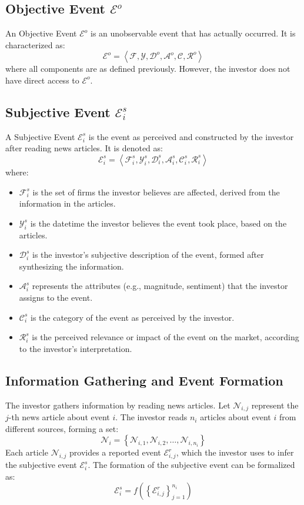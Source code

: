 \documentclass[12pt,article]{memoir}
\begin{document}
\subsection{Objective Event $\mathcal{E}^o$}
An Objective Event $\mathcal{E}^o$ is an unobservable event that has actually occurred. It is characterized as:
$$
\mathcal{E}^o=\left\langle\mathcal{F}, \mathcal{Y}, \mathcal{D}^o, \mathcal{A}^o, \mathcal{C}, \mathcal{R}^o\right\rangle
$$
where all components are as defined previously. However, the investor does not have direct access to $\mathcal{E}^o$.

\subsection{Subjective Event $\mathcal{E}_i^s$}
A Subjective Event $\mathcal{E}_i^s$ is the event as perceived and constructed by the investor after reading news articles. It is denoted as:
$$
\mathcal{E}_i^s=\left\langle\mathcal{F}_i^s, \mathcal{Y}_i^s, \mathcal{D}_i^s, \mathcal{A}_i^s, \mathcal{C}_i^s, \mathcal{R}_i^s\right\rangle
$$
where:
\begin{itemize}
  \item $\mathcal{F}_i^s$ is the set of firms the investor believes are affected, derived from the information in the articles.
  \item $\mathcal{Y}_i^s$ is the datetime the investor believes the event took place, based on the articles.
  \item $\mathcal{D}_i^s$ is the investor's subjective description of the event, formed after synthesizing the information.
  \item $\mathcal{A}_i^s$ represents the attributes (e.g., magnitude, sentiment) that the investor assigns to the event.
  \item $\mathcal{C}_i^s$ is the category of the event as perceived by the investor.
  \item $\mathcal{R}_i^s$ is the perceived relevance or impact of the event on the market, according to the investor's interpretation.
\end{itemize}


\subsection{Information Gathering and Event Formation}

The investor gathers information by reading news articles. Let $\mathcal{N}_{i, j}$ represent the $j$-th news article about event $i$. The investor reads $n_i$ articles about event $i$ from different sources, forming a set:
$$
\mathcal{N}_i=\left\{\mathcal{N}_{i, 1}, \mathcal{N}_{i, 2}, \ldots, \mathcal{N}_{i, n_i}\right\}
$$
Each article $\mathcal{N}_{i, j}$ provides a reported event $\mathcal{E}_{i, j}^r$, which the investor uses to infer the subjective event $\mathcal{E}_i^s$.
The formation of the subjective event can be formalized as:
$$
\mathcal{E}_i^s=f\left(\left\{\mathcal{E}_{i, j}^r\right\}_{j=1}^{n_i}\right)
$$
\end{document}
